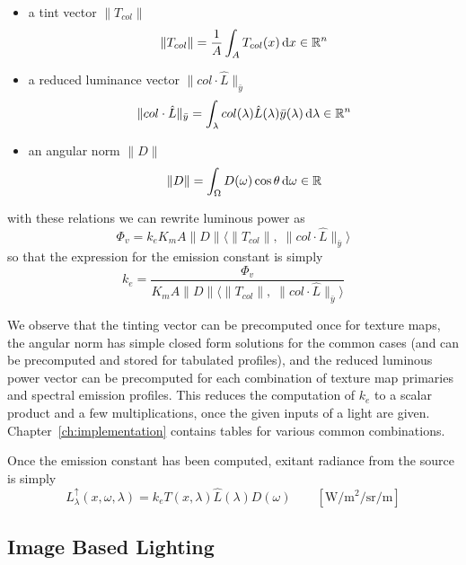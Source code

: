 \begin{itemize}
\item a tint vector $\|T_{col}\|$
\begin{equation}
\|T_{col}\|  = \frac1A\int_A T_{col}(x) \mathop{}\!\mathrm{d} x \in \mathbb{R}^n
\end{equation}
\item a reduced luminance vector $\|col \cdot \hat{L}\|_{\bar y}$
\begin{equation}
\|col \cdot \hat{L}\|_{\bar y} = \int_\lambda col(\lambda) \hat{L}(\lambda)
\bar{y}(\lambda) \mathop{}\!\mathrm{d}\lambda \in \mathbb{R}^n
\end{equation}
\item an angular norm $\|D\|$
\begin{equation}
 \|D\| = \int_\Omega D(\omega) \cos\theta \mathop{}\!\mathrm{d}\omega \in \mathbb{R}
\end{equation}
\end{itemize}
with these relations we can rewrite luminous power as
\begin{equation}
\Phi_v = k_e K_m A \|D\| \big\langle \|T_{col}\|,\; \|col\cdot \hat{L}\|_{\bar
y} \big\rangle
\end{equation}
so that the expression for the emission constant is simply
\begin{equation}
 k_e = \frac{\Phi_v}{K_m A \|D\| \big\langle \|T_{col}\|,\; \|col\cdot \hat{L}\|_{\bar y} \big\rangle }
\end{equation}

We observe that the tinting vector can be precomputed once for texture maps, the
angular norm has simple closed form solutions for the common cases (and can be
precomputed and stored for tabulated profiles), and the reduced luminous power
vector can be precomputed for each combination of texture map primaries and
spectral emission profiles.
This reduces the computation of $k_e$ to a scalar product and a few
multiplications, once the given inputs of a light are given.
Chapter~\ref{ch:implementation} contains tables for various common combinations.

Once the emission constant has been computed, exitant radiance from the source
is simply
\begin{equation}
L^\uparrow_{\lambda}(x, \omega, \lambda) = k_e T(x, \lambda) \hat{L}(\lambda)
D(\omega)
\qquad \left[\si{\watt\per\square\meter\per\steradian\per\meter}\right]
\end{equation}


\subsection{Image Based Lighting}

